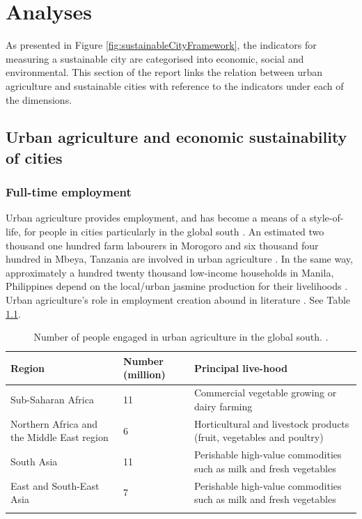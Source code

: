 \chapter{Analyses} %

\label{Chapter:Analyses}

As presented in Figure \ref{fig:sustainableCityFramework}, the indicators for measuring a sustainable city are categorised into economic, social and environmental. This section of the report links the relation between urban agriculture and sustainable cities with reference to the indicators under each of the dimensions.

\section{Urban agriculture and economic sustainability of cities}
\label{sec:economicDim}

\subsection{Full-time employment}

Urban agriculture provides employment, and has become a means of a style-of-life, for people in cities particularly in the global south \cite{Kodjo2014, Zezza2010}. An estimated two thousand one hundred farm labourers in Morogoro and six thousand four hundred in Mbeya, Tanzania are involved in urban agriculture \cite{InternationalLabourOrganization2006}. In the same way, approximately a hundred twenty thousand low-income households in Manila, Philippines depend on the local/urban jasmine production for their livelihoods \cite{IPC2007}. Urban agriculture's role in employment creation abound in literature \cite{Amponsah2016}. See Table \ref{tbl:peopleEngagedInUA}.

\begin{table}[th]
\caption{Number of people engaged in urban agriculture in the global south. \cite{FAO2003}.}
\begin{center}
\begin{tabular}{ p{} p{} p{} } 
\hline
Region & Number (million) & Principal live-hood \\
\hline
Sub-Saharan Africa & 11 & Commercial vegetable growing or dairy farming \\
Northern Africa and the Middle East region & 6 & Horticultural and livestock products (fruit, vegetables and poultry) \\
South Asia & 11 & Perishable high-value commodities such as milk and fresh vegetables \\
East and South-East Asia & 7 & Perishable high-value commodities such as milk and fresh vegetables \\
\hline
\label{tbl:peopleEngagedInUA}
\end{tabular}
\end{center}
\end{table}

